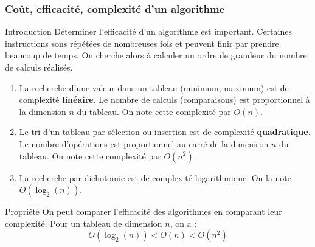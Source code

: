 \documentclass[9pt]{beamer}
\newcounter{num}
\begin{document}
\begin{frame}
\frametitle{Coût, efficacité, complexité d'un algorithme}

\begin{block}{Introduction}
Déterminer l'efficacité d'un algorithme est important. Certaines instructions sons répétées de nombreuses fois et peuvent finir par prendre beaucoup de temps. On cherche alors à calculer un ordre de grandeur du nombre de calculs réalisés.
\begin{enumerate}
\item La recherche d'une valeur dans un tableau (minimum, maximum) est de complexité \textbf{linéaire}. Le nombre de calculs (comparaisons) est proportionnel à la dimension $n$ du tableau. On note cette complexité par $O(n)$.
\item Le tri d'un tableau par sélection ou insertion est de complexité \textbf{quadratique}. Le nombre d'opérations est proportionnel au carré de la dimension $n$ du tableau. On note cette complexité par $O(n^2)$.
\item La recherche par dichotomie est de complexité logarithmique. On la note $O(\log_{2}(n))$.
\end{enumerate}
\end{block}

\begin{block}{Propriété}
On peut comparer l'efficacité des algorithmes en comparant leur complexité. Pour un tableau de dimension $n$, on a : $$O(\log_{2}(n)) < O(n) < O(n^2)$$
\end{block}

\end{frame}
\end{document}
